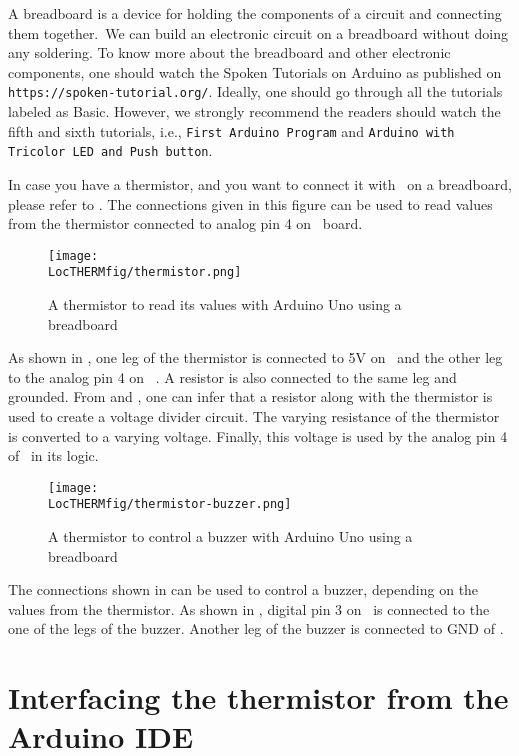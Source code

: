 A breadboard is a device for holding the components of a circuit and connecting
them together. We can build an electronic circuit on a breadboard without doing any
soldering. To know more about the breadboard and other electronic components,
one should watch the Spoken Tutorials on Arduino as published on
  {\tt https://spoken-tutorial.org/}. Ideally, one should go through all the
tutorials labeled as Basic. However, we strongly recommend the readers should
watch the fifth and sixth tutorials, i.e., {\tt First Arduino Program} and
  {\tt Arduino with Tricolor LED and Push button}.

In case you have a thermistor, and you want to connect it with \arduino\ on a breadboard,
please refer to . The connections given in this figure
can be used to read values from the thermistor connected to analog pin 4 on \arduino\
board.
\begin{figure}
  \centering
  \texttt{[image: \\LocTHERMfig/thermistor.png]}
  \caption{A thermistor to read its values with Arduino Uno using a breadboard}
  \label{fig:ard-therm-bread}
\end{figure}
As shown in , one leg of the thermistor is connected
to 5V on \arduino\ and the other leg to the analog pin 4 on  \arduino. A resistor is also
connected to the same leg and grounded. From \figref{fig:therm-conn} and , one can infer that a resistor
along with the thermistor is used to create a voltage divider circuit. The varying
resistance of the thermistor is converted to a varying voltage. Finally, this voltage is used
by the analog pin 4 of \arduino\ in its logic.

\begin{figure}
  \centering
  \texttt{[image: \\LocTHERMfig/thermistor-buzzer.png]}
  \caption{A thermistor to control a buzzer with Arduino Uno using a breadboard}
  \label{fig:ard-therm-buzzer}
\end{figure}
The connections shown in  can be used to control a buzzer,
depending on the values from the thermistor. As shown in \figref{fig:ard-therm-buzzer},
digital pin 3 on \arduino\ is connected to the one of the legs of the buzzer. Another
leg of the buzzer is connected to GND of \arduino.


\section{Interfacing the thermistor from the Arduino IDE}
